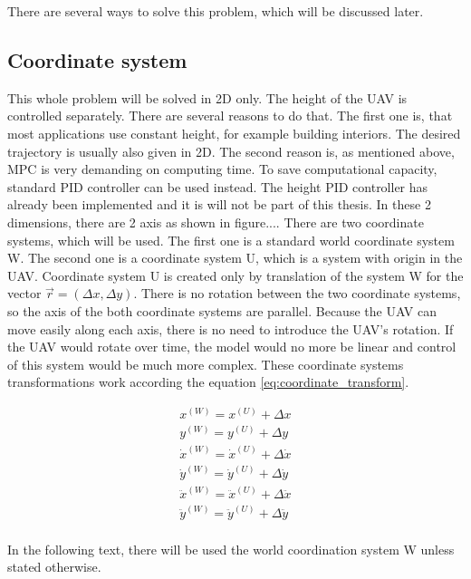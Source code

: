 \documentclass{article}
\begin{document}
There are several ways to solve this problem, which will be discussed later.





\subsection{Coordinate system}
This whole problem will be solved in 2D only. The height of the UAV is controlled separately. There are several reasons to do that. The first one is, that most applications use constant height, for example building interiors. The desired trajectory is usually also given in 2D. The second reason is, as mentioned above, MPC is very demanding on computing time. To save computational capacity, standard PID controller can be used instead. The height PID controller has already been implemented and it is will not be part of this thesis. In these 2 dimensions, there are 2 axis as shown in {\color{red}figure...}. There are two coordinate systems, which will be used. The first one is a standard world coordinate system W. The second one is a coordinate system U, which is a system with origin in the UAV. Coordinate system U is created only by translation of the system W for the vector $\vec{r} = (\Delta x, \Delta y)$. There is no rotation between the two coordinate systems, so the axis of the both coordinate systems are parallel. Because the UAV can move easily along each axis, there is no need to introduce the UAV's rotation. If the UAV would rotate over time, the model would no more be linear and control of this system would be much more complex. These coordinate systems transformations work according the equation \ref{eq:coordinate_transform}.

\begin{equation}
\label{eq:coordinate_transform}
\begin{split}
x^{(W)} = x^{(U)}+\Delta x	\\
y^{(W)} = y^{(U)}+\Delta y	\\
\dot{x}^{(W)} = \dot{x}^{(U)}+\Delta \dot{x}	\\
\dot{y}^{(W)} = \dot{y}^{(U)}+\Delta \dot{y}	\\
\ddot{x}^{(W)} = \ddot{x}^{(U)}+\Delta \ddot{x}	\\
\ddot{y}^{(W)} = \ddot{y}^{(U)}+\Delta \ddot{y}	\\
\end{split}
\end{equation}

In the following text, there will be used the world coordination system W unless stated otherwise.
\end{document}
